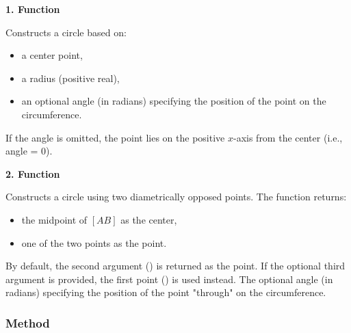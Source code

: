 \textbf{1. Function \code{through(center, radius, <angle>])}}

Constructs a circle based on:
\begin{itemize}
  \item a center point,
  \item a radius (positive real),
  \item an optional angle (in radians) specifying the position of the point on the circumference.
\end{itemize}
If the angle is omitted, the point lies on the positive \(x\)-axis from the center (i.e., angle = 0).

\textbf{2. Function }

Constructs a circle using two diametrically opposed points. The function returns:

\begin{itemize}
  \item the midpoint of \([AB]\) as the center,
  \item one of the two points as the  point.
\end{itemize}

By default, the second argument () is returned as the  point. If the optional third argument  is provided, the first point () is used instead. The optional angle (in radians) specifying the position of the point "through" on the circumference.

\vspace{1em}

\begin{tkzexample}[latex=6cm]
\end{tkzexample}

\subsubsection{Method }
\label{ssub:method_circle_radius}

